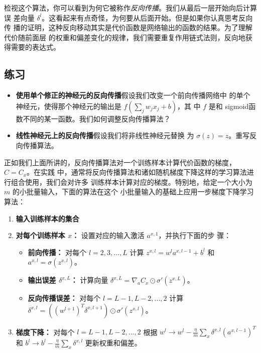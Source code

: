 检视这个算法，你可以看到为何它被称作\emph{反向传播}。我们从最后一层开始向后计算误
差向量 $\delta^l$。这看起来有点奇怪，为何要从后面开始。但是如果你认真思考反向传
播的证明，这种反向移动其实是代价函数是网络输出的函数的结果。为了理解代价随前面层
的权重和偏差变化的规律，我们需要重复作用链式法则，反向地获得需要的表达式。

\subsection*{练习}

\begin{itemize}
\item \textbf{使用单个修正的神经元的反向传播}\quad 假设我们改变一个前向传播网络中
  的单个神经元，使得那个神经元的输出是 $f(\sum_j w_jx_j + b)$，其
  中 $f$ 是和 sigmoid函数不同的某一函数。我们如何调整反向传播算法？
\item \textbf{线性神经元上的反向传播}\quad 假设我们将非线性神经元替换
  为 $\sigma(z) = z$。重写反向传播算法。
\end{itemize}

正如我们上面所讲的，反向传播算法对一个训练样本计算代价函数的梯度，$C=C_x$。在实践
中，通常将反向传播算法和诸如随机梯度下降这样的学习算法进行组合使用，我们会对许多
训练样本计算对应的梯度。特别地，给定一个大小为 $m$ 的小批量输入，下面的算法在这个
小批量输入的基础上应用一步梯度下降学习算法：

\begin{enumerate}
\item \textbf{输入训练样本的集合}
\item \textbf{对每个训练样本 $x$：} 设置对应的输入激活 $a^{x,1}$，并执行下面的步
  骤：
  \begin{itemize}
  \item \textbf{前向传播：} 对每个 $l=2,3,...,L$ 计算 $z^{x,l} = w^la^{x,l-1} +
    b^l$ 和 $a^{x,l} = \sigma(z^{x,l})$。
  \item \textbf{输出误差 $\delta^{x,L}$：} 计算向量
    $\delta^{x,L} = \nabla_a C_x \odot \sigma'(z^{x,L})$。
  \item \textbf{反向传播误差：} 对每个 $l=L-1, L-2, ..., 2$ 计算
    $\delta^{x,l} = ((w^{l+1})^T\delta^{x,l+1})\odot \sigma'(z^{x,l})$。
  \end{itemize}
\item \textbf{梯度下降：} 对每个 $l=L-1, L-2, ..., 2$ 根据
  $w^l \rightarrow w^l - \frac{\eta}{m}\sum_x \delta^{x,l}(a^{x,l-1})^T$ 和
  $b^l \rightarrow b^l - \frac{\eta}{m}\sum_x \delta^{x,l}$ 更新权重和偏差。
\end{enumerate}

